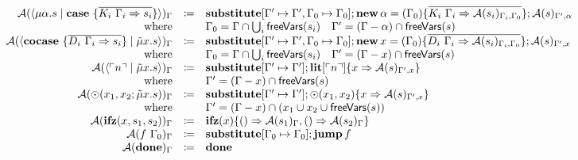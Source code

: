 \[\begin{array}{rcll}
    \mathcal{A}(\langle \mu\alpha.s \mid \mathbf{case}\ \{ \overline{K_i\ \Gamma_i \Rightarrow s_i} \} \rangle)_{\Gamma} & \coloneq & \mathbf{substitute}[\Gamma' \mapsto \Gamma', \Gamma_0 \mapsto \Gamma_0]; \mathbf{new}\, \alpha = (\Gamma_0)\{ \overline{K_i\ \Gamma_i \Rightarrow \mathcal{A}(s_i)_{\Gamma_i, \Gamma_0}} \}; \mathcal{A}(s)_{\Gamma', \alpha} & \\
    \text{where} &  & \Gamma_0 = \Gamma \cap \bigcup_i \mathsf{freeVars}(s_i)  \quad  \Gamma' = (\Gamma - \alpha) \cap \mathsf{freeVars}(s) & \\
    \mathcal{A}(\langle \mathbf{cocase}\ \{ \overline{D_i\ \Gamma_i \Rightarrow s_i} \} \mid \tilde{\mu}x.s \rangle)_{\Gamma} & \coloneq & \mathbf{substitute}[\Gamma' \mapsto \Gamma', \Gamma_0 \mapsto \Gamma_0]; \mathbf{new}\, x = (\Gamma_0)\{ \overline{D_i\ \Gamma_i \Rightarrow \mathcal{A}(s_i)_{\Gamma_i, \Gamma_0}} \}; \mathcal{A}(s)_{\Gamma', x} & \\
    \text{where} &  & \Gamma_0 = \Gamma \cap \bigcup_i \mathsf{freeVars}(s_i)  \quad  \Gamma' = (\Gamma - x) \cap \mathsf{freeVars}(s) & \\
    \mathcal{A}(\langle \ulcorner n \urcorner \mid \tilde{\mu}x.s \rangle)_{\Gamma} & \coloneq & \mathbf{substitute}[\Gamma' \mapsto \Gamma']; \mathbf{lit}[\ulcorner n \urcorner]\{ x \Rightarrow \mathcal{A}(s)_{\Gamma', x} \} & \\
    \text{where} &  & \Gamma' = (\Gamma - x)\cap \mathsf{freeVars}(s) & \\
    \mathcal{A}(\odot(x_1, x_2; \tilde{\mu}x.s))_{\Gamma} & \coloneq & \mathbf{substitute}[\Gamma' \mapsto \Gamma']; \odot(x_1, x_2)\{ x \Rightarrow \mathcal{A}(s)_{\Gamma', x} \} & \\
    \text{where} &  & \Gamma' = (\Gamma - x) \cap (x_1 \cup x_2 \cup \mathsf{freeVars}(s)) & \\
    \mathcal{A}(\mathbf{ifz}(x, s_1, s_2))_{\Gamma}{} & \coloneq & \mathbf{ifz}(x)\{ () \Rightarrow \mathcal{A}(s_1)_{\Gamma}, () \Rightarrow \mathcal{A}(s_2)_{\Gamma} \} & \\
    \mathcal{A}(f\ \Gamma_0)_{\Gamma} & \coloneq & \mathbf{substitute}[\Gamma_0 \mapsto \Gamma_0]; \mathbf{jump}\, f & \\
    \mathcal{A}(\mathbf{done})_{\Gamma} & \coloneq & \mathbf{done} & \\
  \end{array}
\]
